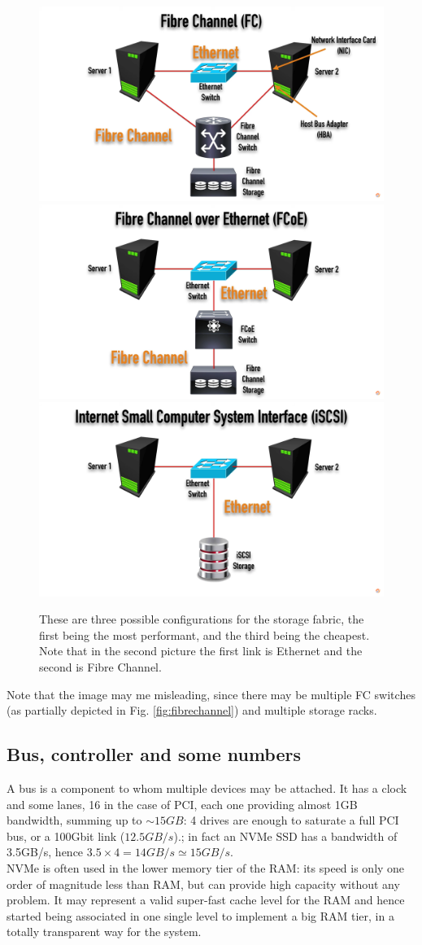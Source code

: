 \begin{figure}[htbp]
   \centering
   \includegraphics[width=0.32\columnwidth]{images/storage_fabric1.png}
   \includegraphics[width=0.32\columnwidth]{images/storage_fabric2.png}
   \includegraphics[width=0.32\columnwidth]{images/storage_fabric3.png}
   \caption{These are three possible configurations for the storage fabric, the first being the most performant, and the third being the cheapest.
   Note that in the second picture the first link is Ethernet and the second is Fibre Channel.}
   \label{fig:storage_fabric}
\end{figure}
Note that the image may me misleading, since there may be multiple FC switches (as partially depicted in Fig. \ref{fig:fibrechannel}) and multiple storage racks.
   
\subsection{Bus, controller and some numbers}
A bus is a component to whom multiple devices may be attached. It has a clock and some lanes, 16 in the case of PCI, each one providing almost 1GB bandwidth, summing up to $\sim 15GB$: 4 drives are enough to saturate a full PCI bus, or a 100Gbit link ($12.5GB/s$).;
in fact an NVMe SSD has a bandwidth of 3.5GB/s, hence $3.5\times 4 = 14GB/s \simeq 15GB/s$.\\
NVMe is often used in the lower memory tier of the RAM: its speed is only one order of magnitude less than RAM, but can provide high capacity without any problem.
It may represent a valid super-fast cache level for the RAM and hence started being associated in one single level to implement a big RAM tier, in a totally transparent way for the system.

